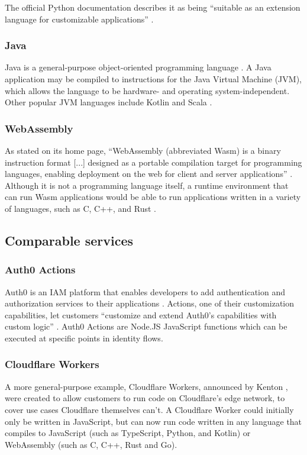 The official Python documentation describes it as being ``suitable as an extension language for customizable applications'' \autocite{PSF2023}.

\subsubsection{Java}
Java is a general-purpose object-oriented programming language \autocite{Lindholm2015}. A Java application may be compiled to instructions for the Java Virtual Machine (JVM), which allows the language to be hardware- and operating system-independent. Other popular JVM languages include Kotlin and Scala \autocite{StackOverflow2023, JetBrains2023}.

\subsubsection{WebAssembly}
As stated on its home page, ``WebAssembly (abbreviated Wasm) is a binary instruction format [...] designed as a portable compilation target for programming languages, enabling deployment on the web for client and server applications'' \autocite{WebAssembly}. Although it is not a programming language itself, a runtime environment that can run Wasm applications would be able to run applications written in a variety of languages, such as C, C++, and Rust \autocite{EmscriptenContributors2015, RWWG2023}.

\subsection{Comparable services}
\subsubsection{Auth0 Actions}
Auth0 is an IAM platform that enables developers to add authentication and authorization services to their applications \autocite{Auth0Overview}. Actions, one of their customization capabilities, let customers ``customize and extend Auth0's capabilities with custom logic'' \autocite{Auth0Actions}. Auth0 Actions are Node.JS JavaScript functions which can be executed at specific points in identity flows.

\subsubsection{Cloudflare Workers}
A more general-purpose example, Cloudflare Workers, announced by Kenton \textcite{Varda2017}, were created to allow customers to run code on Cloudflare's edge network, to cover use cases Cloudflare themselves can't. A Cloudflare Worker could initially only be written in JavaScript, but can now run code written in any language that compiles to JavaScript (such as TypeScript, Python, and Kotlin) or WebAssembly (such as C, C++, Rust and Go). \autocite{Varda2018, Koeninger2020}


